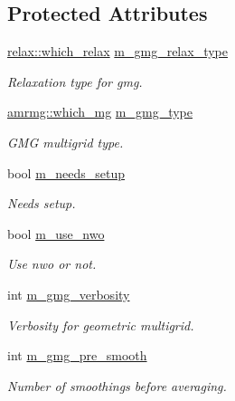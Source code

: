 \subsection*{Protected Attributes}
\begin{DoxyCompactItemize}
\item 
\hyperlink{namespacerelax_a1b017edf55c06d103aa5b61e015fe219}{relax\+::which\+\_\+relax} \hyperlink{classpoisson__multifluid__gmg_a768a005e945a1587fbd569dbe0194bc5}{m\+\_\+gmg\+\_\+relax\+\_\+type}
\begin{DoxyCompactList}\small\item\em Relaxation type for gmg. \end{DoxyCompactList}\item 
\hyperlink{namespaceamrmg_aa3e75c1253c968e52106305f762a7952}{amrmg\+::which\+\_\+mg} \hyperlink{classpoisson__multifluid__gmg_a8157c7d2d4166f7c936e896a0fd2a63c}{m\+\_\+gmg\+\_\+type}
\begin{DoxyCompactList}\small\item\em G\+MG multigrid type. \end{DoxyCompactList}\item 
bool \hyperlink{classpoisson__multifluid__gmg_add2121a6f35babe105bac8f95feec753}{m\+\_\+needs\+\_\+setup}
\begin{DoxyCompactList}\small\item\em Needs setup. \end{DoxyCompactList}\item 
bool \hyperlink{classpoisson__multifluid__gmg_aa3438296d40eb763590cdfc9f5044b4f}{m\+\_\+use\+\_\+nwo}
\begin{DoxyCompactList}\small\item\em Use nwo or not. \end{DoxyCompactList}\item 
int \hyperlink{classpoisson__multifluid__gmg_a95b6677094d33585fda164a7195c531d}{m\+\_\+gmg\+\_\+verbosity}
\begin{DoxyCompactList}\small\item\em Verbosity for geometric multigrid. \end{DoxyCompactList}\item 
int \hyperlink{classpoisson__multifluid__gmg_ab9c208be2808cdde68c00a2f9013e261}{m\+\_\+gmg\+\_\+pre\+\_\+smooth}
\begin{DoxyCompactList}\small\item\em Number of smoothings before averaging. \end{DoxyCompactList}\item 

\end{DoxyCompactItemize}
